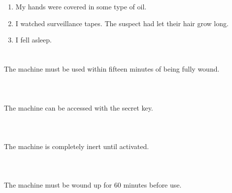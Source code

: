 \documentclass{article}
\begin{document}
    \newpage
    
    \section{}
    
    \begin{enumerate}
    
    \item My hands were covered in some type of oil.\\
    
    \item I watched surveillance tapes. The suspect had let their hair grow long.\\
    
    \item I fell asleep.\\
    
    \end{enumerate}
     
    \newpage
    
    \section{}
    The machine must be used within fifteen minutes of being fully wound.\\\\ 
    \newpage
    
    \section{}
    The machine can be accessed with the secret key.\\\\ 
    \newpage
    
    \section{}
    The machine is completely inert until activated.\\\\ 
    \newpage
    
    \section{}
    The machine must be wound up for 60 minutes before use.\\\\ 
    \newpage
    
\end{document}
